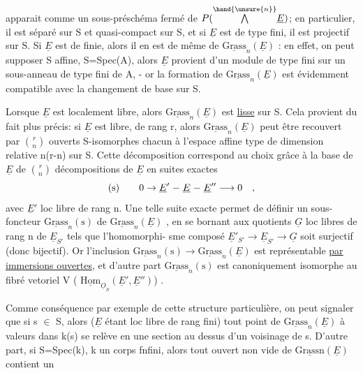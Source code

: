 
apparait comme un sous-préschéma fermé de $P(\overset{\hand{\unsure{n}}}{\bigwedge}\underline{E})$; en particulier, il
est séparé sur S et quasi-compact sur S, et  si $\underline{E}$  est de type fini,
il est projectif sur S. Si $\underline{E}$ est de  finie, alors
il en est de même de $\underline{\text{Grass}}_n(\underline{E})$ : en effet,  on peut
supposer S affine, S=Spec(A), alors $\underline{E}$ provient d'un module de type fini
sur un sous-anneau de type fini de A, -  or la formation de $\underline{\text{Grass}}_n(\underline{E})$
est évidemment compatible avec la changement de base sur S.

Lorsque $\underline{E}$  est localement libre, alors  $\underline{\text{Grass}}_n(\underline{E})$
est \uline{lisse} sur S. Cela provient du fait plus précis: si $\underline{E}$ est libre,
de rang r, alors  $\underline{\text{Grass}}_n(\underline{E})$  peut être recouvert par  $\binom{r}{n}$  ouverts
S-isomorphes chacun  à  l'espace affine type de dimension relative
n(r-n)  sur S.  Cette décomposition correspond au choix grâce à la base
de $\underline{E}$  de  $\binom{r}{n}$  décompositions de $\underline{E}$  en  suites
exactes
\[
\text{(s)} \qquad 0 \rightarrow \underline{E}' \relbar \underline{E} \relbar \underline{E}'' \longrightarrow 0 \quad ,
\]
avec $\underline{E}'$  loc libre de rang n.  Une telle suite exacte permet
de définir un sous-foncteur  $\underline{\text{Grass}}_n(\text{s})$  de  $\underline{\text{Grass}}_n(\underline{E})$ , en se bornant
aux  quotients  $\underline{G}$  loc libres de rang  n de  $\underline{E}_{S'}$  tels que l'homomorphi-%
sme composé  $\underline{E}'_{S'} \longrightarrow \underline{E}_{S'} \longrightarrow \underline{G}$  soit surjectif (donc bijectif). Or
l'inclusion  $\underline{\text{Grass}}_n(\text{s}) \rightarrow \underline{\text{Grass}}_n(\underline{E})$  est représentable \uline{par immersions
ouvertes}, et d'autre part  $\underline{\text{Grass}}_n(\text{s})$  est canoniquement isomorphe
au fibré vetoriel    V ( $\underline{\text{Hom}}_{\underline{O}_S}(\underline{E}',\underline{E}'')$) .

Comme conséquence par exemple de cette structure particulière,
on peut signaler que si s $\in$ S, alors ($\underline{E}$ étant loc libre de rang fini)
tout point de $\underline{\text{Grass}}_n(\underline{E})$  à valeurs dans k(s)  se relève en une section
au dessus d'un voisinage de s.  D'autre part, si S=Spec(k),  k
un corps fnfini, alors tout ouvert non vide de $\underline{\text{Grassn}}(\underline{E})$  contient un

